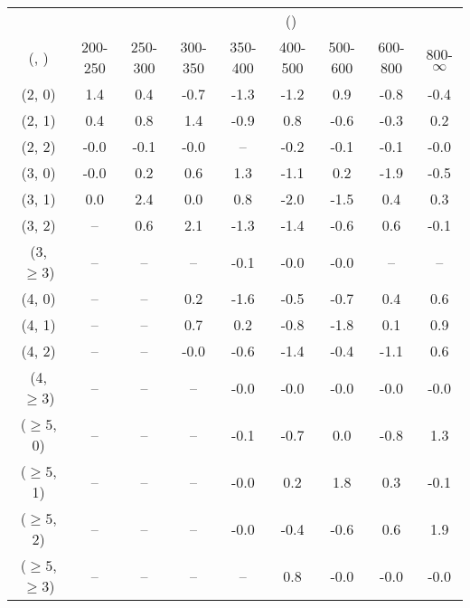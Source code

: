\begin{table}[h!]
\tiny
\centering
{}
\begin{tabular}
{ccccccccc}
	\hline\hline
&	& \multicolumn{8}{c}{\scalht (\gev)} \\ 
	 (\njet,  \nb) & 200-250 & 250-300 & 300-350 & 350-400 & 400-500 & 500-600 & 600-800 & 800-$\infty$ \\ [0.8ex] 
\hline
	(2, 0) & 1.4 & 0.4 & -0.7 & -1.3 & -1.2 & 0.9 & -0.8 & -0.4 \\[0.5ex] 
	(2, 1) & 0.4 & 0.8 & 1.4 & -0.9 & 0.8 & -0.6 & -0.3 & 0.2 \\[0.5ex] 
	(2, 2) & -0.0 & -0.1 & -0.0 & -- & -0.2 & -0.1 & -0.1 & -0.0 \\[0.5ex] 
	(3, 0) & -0.0 & 0.2 & 0.6 & 1.3 & -1.1 & 0.2 & -1.9 & -0.5 \\[0.5ex] 
	(3, 1) & 0.0 & 2.4 & 0.0 & 0.8 & -2.0 & -1.5 & 0.4 & 0.3 \\[0.5ex] 
	(3, 2) & -- & 0.6 & 2.1 & -1.3 & -1.4 & -0.6 & 0.6 & -0.1 \\[0.5ex] 
	(3, $\ge3$) & -- & -- & -- & -0.1 & -0.0 & -0.0 & -- & -- \\[0.5ex] 
	(4, 0) & -- & -- & 0.2 & -1.6 & -0.5 & -0.7 & 0.4 & 0.6 \\[0.5ex] 
	(4, 1) & -- & -- & 0.7 & 0.2 & -0.8 & -1.8 & 0.1 & 0.9 \\[0.5ex] 
	(4, 2) & -- & -- & -0.0 & -0.6 & -1.4 & -0.4 & -1.1 & 0.6 \\[0.5ex] 
	(4, $\ge3$) & -- & -- & -- & -0.0 & -0.0 & -0.0 & -0.0 & -0.0 \\[0.5ex] 
	($\ge5$, 0) & -- & -- & -- & -0.1 & -0.7 & 0.0 & -0.8 & 1.3 \\[0.5ex] 
	($\ge5$, 1) & -- & -- & -- & -0.0 & 0.2 & 1.8 & 0.3 & -0.1 \\[0.5ex] 
	($\ge5$, 2) & -- & -- & -- & -0.0 & -0.4 & -0.6 & 0.6 & 1.9 \\[0.5ex] 
	($\ge5$, $\ge3$) & -- & -- & -- & -- & 0.8 & -0.0 & -0.0 & -0.0 \\[0.5ex] 
	\hline
	\hline
\end{tabular}
\end{table}
